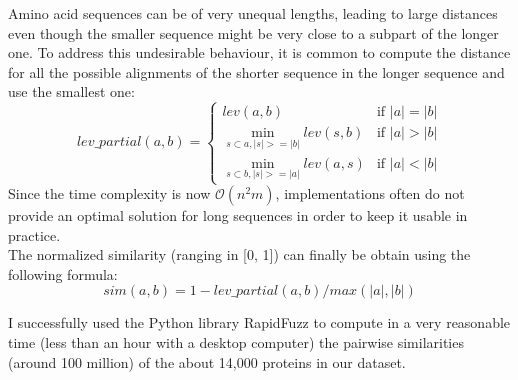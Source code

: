 \documentclass{article}
\begin{document}
Amino acid sequences can be of very unequal lengths, leading to large distances even though the smaller sequence might be very close to a subpart of the longer one. To address this undesirable behaviour, it is common to compute the distance for all the possible alignments of the shorter sequence in the longer sequence and use the smallest one: 
$$
lev\_partial(a, b) = \left\{
    \begin{array}{ll}
        lev(a, b) & \mbox{if } \vert a \vert = \vert b \vert \\
        \min_{s \subset a, \vert s \vert >= \vert b \vert}lev(s, b) & \mbox{if } \vert a \vert > \vert b \vert \\
        \min_{s \subset b, \vert s \vert >= \vert a \vert}lev(a, s) & \mbox{if } \vert a \vert < \vert b \vert
    \end{array}
\right.
$$
Since the time complexity is now $\mathcal{O}(n^2m)$, implementations often do not provide an optimal solution for long sequences in order to keep it usable in practice. \\

The normalized similarity (ranging in [0, 1]) can finally be obtain using the following formula:
$$
sim(a, b) = 1 - lev\_partial(a, b) / max(\vert a \vert, \vert b \vert)
$$

I successfully used the Python \cite{Python} library RapidFuzz \cite{RapidFuzz} to compute in a very reasonable time (less than an hour with a desktop computer) the pairwise similarities (around 100 million) of the about 14,000 proteins in our dataset.
\end{document}
